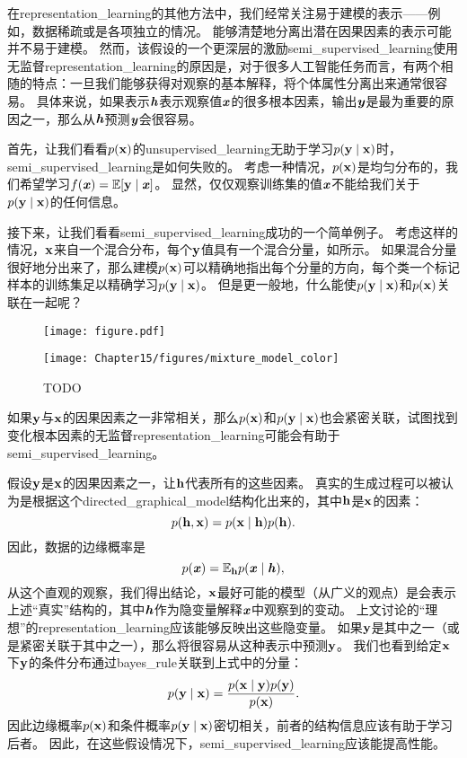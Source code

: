 在\gls{representation_learning}的其他方法中，我们经常关注易于建模的表示——例如，数据稀疏或是各项独立的情况。
能够清楚地分离出潜在因果因素的表示可能并不易于建模。
然而，该假设的一个更深层的激励\gls{semi_supervised_learning}使用无监督\gls{representation_learning}的原因是，对于很多人工智能任务而言，有两个相随的特点：一旦我们能够获得对观察的基本解释，将个体属性分离出来通常很容易。
具体来说，如果表示$\boldsymbol{\mathit{h}}$表示观察值$\boldsymbol{\mathit{x}}$的很多根本因素，输出$\boldsymbol{\mathit{y}}$是最为重要的原因之一，那么从$\boldsymbol{\mathit{h}}$预测$\boldsymbol{\mathit{y}}$会很容易。


首先，让我们看看$p(\mathbf{x})$的\gls{unsupervised_learning}无助于学习$p(\mathbf{y}\mid\mathbf{x})$时，\gls{semi_supervised_learning}是如何失败的。
考虑一种情况，$p(\mathbf{x})$是均匀分布的，我们希望学习$f(\boldsymbol{\mathit{x}}) = \mathbb{E}[\mathbf{y} \mid \boldsymbol{\mathit{x}}]$。
显然，仅仅观察训练集的值$\boldsymbol{\mathit{x}}$不能给我们关于$p(\mathbf{y} \mid \mathbf{x})$的任何信息。


接下来，让我们看看\gls{semi_supervised_learning}成功的一个简单例子。
考虑这样的情况，$\mathbf{x}$来自一个混合分布，每个$\mathbf{y}$值具有一个混合分量，如所示。
如果混合分量很好地分出来了，那么建模$p(\mathbf{x})$可以精确地指出每个分量的方向，每个类一个标记样本的训练集足以精确学习$p(\mathbf{y} \mid \mathbf{x})$。
但是更一般地，什么能使$p(\mathbf{y} \mid \mathbf{x})$和$p(\mathbf{x})$关联在一起呢？

\begin{figure}[!htb]
\ifOpenSource
\centerline{\texttt{[image: figure.pdf]}}
\else
\centerline{\texttt{[image: Chapter15/figures/mixture\_model\_color]}}
\fi
\caption{TODO}
\label{fig:chap15_mixture_model}
\end{figure}

如果$\mathbf{y}$与$\mathbf{x}$的因果因素之一非常相关，那么$p(\mathbf{x})$和$p(\mathbf{y} \mid \mathbf{x})$也会紧密关联，试图找到变化根本因素的无监督\gls{representation_learning}可能会有助于\gls{semi_supervised_learning}。


假设$\mathbf{y}$是$\mathbf{x}$的因果因素之一，让$\mathbf{h}$代表所有的这些因素。
真实的生成过程可以被认为是根据这个\gls{directed_graphical_model}结构化出来的，其中$\mathbf{h}$是$\mathbf{x}$的因素：
\begin{equation}
	p(\mathbf{h}, \mathbf{x}) = p(\mathbf{x} \mid \mathbf{h}) p(\mathbf{h}).
\end{equation}
因此，数据的边缘概率是
\begin{equation}
	p(\boldsymbol{\mathit{x}}) = \mathbb{E}_{\mathbf{h}} p(\boldsymbol{\mathit{x}} \mid \boldsymbol{\mathit{h}}),
\end{equation}
从这个直观的观察，我们得出结论，$\mathbf{x}$最好可能的模型（从广义的观点）是会表示上述``真实''结构的，其中$\boldsymbol{\mathit{h}}$作为隐变量解释$\boldsymbol{\mathit{x}}$中观察到的变动。
上文讨论的``理想''的\gls{representation_learning}应该能够反映出这些隐变量。
如果$\mathbf{y}$是其中之一（或是紧密关联于其中之一），那么将很容易从这种表示中预测$\mathbf{y}$。
我们也看到给定$\mathbf{x}$下$\mathbf{y}$的条件分布通过\gls{bayes_rule}关联到上式中的分量：
\begin{equation}
	p(\mathbf{y} \mid \mathbf{x}) = \frac{ p(\mathbf{x} \mid \mathbf{y}) p(\mathbf{y}) }{p(\mathbf{x})}.
\end{equation}
因此边缘概率$p(\mathbf{x})$和条件概率$p(\mathbf{y} \mid \mathbf{x})$密切相关，前者的结构信息应该有助于学习后者。
因此，在这些假设情况下，\gls{semi_supervised_learning}应该能提高性能。



